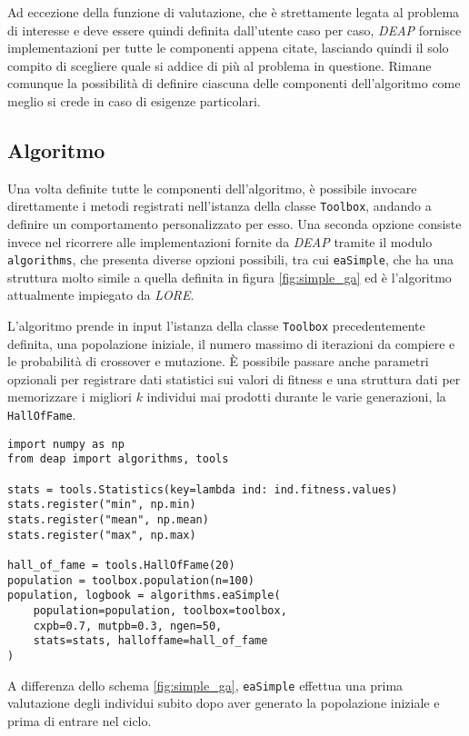 Ad eccezione della funzione di valutazione, che è strettamente legata al
problema di interesse e deve essere quindi definita dall'utente caso per caso,
\textit{DEAP} fornisce implementazioni per tutte le componenti appena citate,
lasciando quindi il solo compito di scegliere quale si addice di più al
problema in questione. Rimane comunque la possibilità di definire ciascuna
delle componenti dell'algoritmo come meglio si crede in caso di esigenze
particolari.

\subsection*{Algoritmo}\label{ssec: rw_algos}

Una volta definite tutte le componenti dell'algoritmo, è possibile invocare
direttamente i metodi registrati nell'istanza della classe \verb|Toolbox|,
andando a definire un comportamento personalizzato per esso. Una seconda opzione
consiste invece nel ricorrere alle implementazioni fornite da \textit{DEAP}
tramite il modulo \verb|algorithms|, che presenta diverse opzioni possibili,
tra cui \verb|eaSimple|, che ha una struttura molto simile a quella definita in
figura \ref{fig:simple_ga} ed è l'algoritmo attualmente impiegato da
\textit{LORE}.

L'algoritmo prende in input l'istanza della classe \verb|Toolbox|
precedentemente definita, una popolazione iniziale, il numero massimo di
iterazioni da compiere e le probabilità di crossover e mutazione. \`E possibile
passare anche parametri opzionali per registrare dati statistici sui valori di
fitness e una struttura dati per memorizzare i migliori $k$ individui mai
prodotti durante le varie generazioni, la \verb|HallOfFame|.

\begin{lstlisting}[caption={DEAP \lstinline|eaSimple|}]
import numpy as np
from deap import algorithms, tools

stats = tools.Statistics(key=lambda ind: ind.fitness.values)
stats.register("min", np.min)
stats.register("mean", np.mean)
stats.register("max", np.max)

hall_of_fame = tools.HallOfFame(20)
population = toolbox.population(n=100)
population, logbook = algorithms.eaSimple(
	population=population, toolbox=toolbox,
	cxpb=0.7, mutpb=0.3, ngen=50,
	stats=stats, halloffame=hall_of_fame
)
\end{lstlisting}

A differenza dello schema \ref{fig:simple_ga}, \verb|eaSimple| effettua una
prima valutazione degli individui subito dopo aver generato la popolazione
iniziale e prima di entrare nel ciclo.

